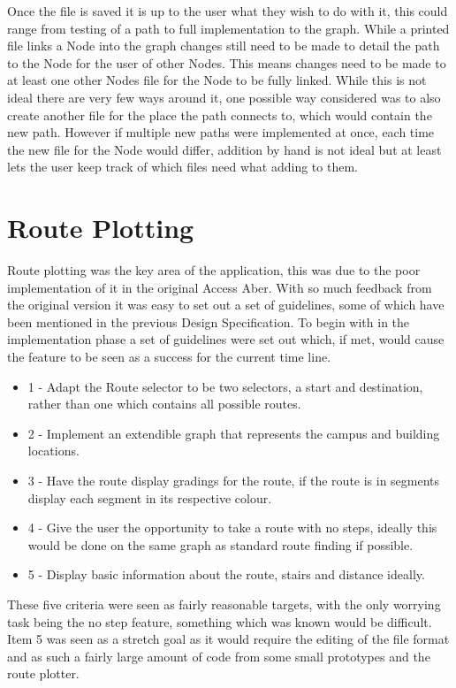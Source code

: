 Once the file is saved it is up to the user what they wish to do with it, this could range from testing of a path to full implementation to the graph. While a printed file links a Node into the graph changes still need to be made to detail the path to the Node for the user of other Nodes. This means changes need to be made to at least one other Nodes file for the Node to be fully linked. While this is not ideal there are very few ways around it, one possible way considered was to also create another file for the place the path connects to, which would contain the new path. However if multiple new paths were implemented at once, each time the new file for the Node would differ, addition by hand is not ideal but at least lets the user keep track of which files need what adding to them. 

\section{Route Plotting}
Route plotting was the key area of the application, this was due to the poor implementation of it in the original Access Aber\cite{aa}. With so much feedback from the original version it was easy to set out a set of guidelines, some of which have been mentioned in the previous Design Specification. To begin with in the implementation phase a set of guidelines were set out which, if met, would cause the feature to be seen as a success for the current time line. 

\begin{itemize}
	\item 1 - Adapt the Route selector to be two selectors, a start and destination, rather than one which contains all possible routes.
	\item 2 - Implement an extendible graph that represents the campus and building locations.
	\item 3 - Have the route display gradings for the route, if the route is in segments display each segment in its respective colour.
	\item 4 - Give the user the opportunity to take a route with no steps, ideally this would be done on the same graph as standard route finding if possible.
	\item 5 - Display basic information about the route, stairs and distance ideally.  
\end{itemize}

These five criteria were seen as fairly reasonable targets, with the only worrying task being the no step feature, something which was known would be difficult. Item 5 was seen as a stretch goal as it would require the editing of the file format and as such a fairly large amount of code from some small prototypes and the route plotter.

